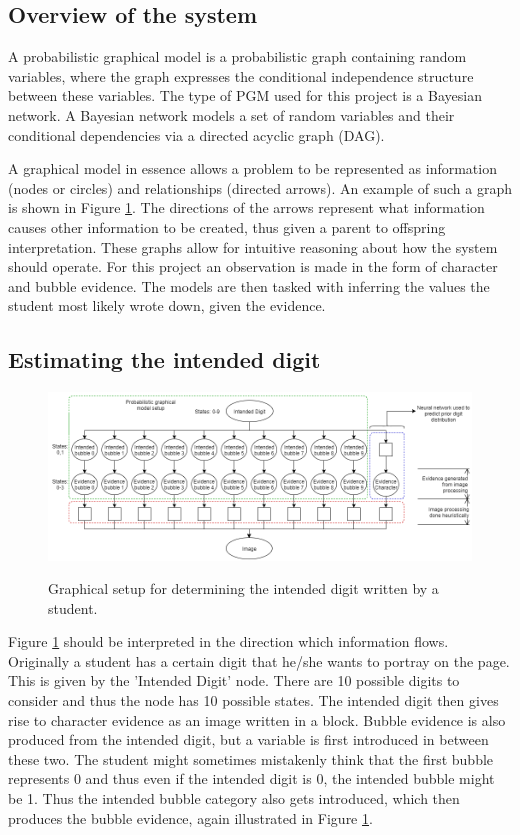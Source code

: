 \subsection{Overview of the system}
A probabilistic graphical model is a probabilistic graph containing random variables, where the graph expresses the conditional independence structure between these variables. The type of PGM used for this project is a Bayesian network. A Bayesian network models a set of random variables and their conditional dependencies via a directed acyclic graph (DAG). %

A graphical model in essence allows a problem to be represented as information (nodes or circles) and relationships (directed arrows). An example of such a graph is shown in Figure \ref{fig:pgmDigit}. The directions of the arrows represent what information causes other information to be created, thus given a parent to offspring interpretation. These graphs allow for intuitive reasoning about how the system should operate. For this project an observation is made in the form of character and bubble evidence. The models are then tasked with inferring the values the student most likely wrote down, given the evidence.

\subsection{Estimating the intended digit}
\label{sec:studentDigit}

\begin{figure}
  \centering
  \includegraphics[width=16cm]{pgmDigit}\\
  \caption{Graphical setup for determining the intended digit written by a student.}
  \label{fig:pgmDigit}
\end{figure}

Figure \ref{fig:pgmDigit} should be interpreted in the direction which information flows. Originally a student has a certain digit that he/she wants to portray on the page. This is given by the 'Intended Digit' node. There are 10 possible digits to consider and thus the node has 10 possible states. The intended digit then gives rise to character evidence as an image written in a block. Bubble evidence is also produced from the intended digit, but a variable is first introduced in between these two. The student might sometimes mistakenly think that the first bubble represents 0 and thus even if the intended digit is 0, the intended bubble might be 1. Thus the intended bubble category also gets introduced, which then produces the bubble evidence, again illustrated in Figure \ref{fig:pgmDigit}.  

